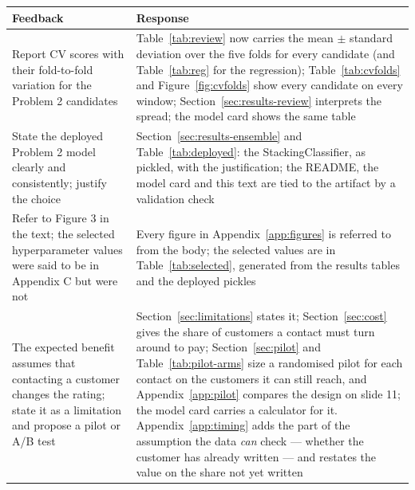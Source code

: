 \begin{center}
\begin{minipage}{\linewidth}
\centering
{}
\label{tab:feedback2}
\small
\begin{tabular}{@{}p{4.4cm}p{10.1cm}@{}}
\toprule
\textbf{Feedback} & \textbf{Response} \\
\midrule
Report CV scores with their fold-to-fold variation for the Problem 2
candidates &
Table~\ref{tab:review} now carries the mean $\pm$ standard deviation over the
five folds for every candidate (and Table~\ref{tab:reg} for the regression);
Table~\ref{tab:cvfolds} and Figure~\ref{fig:cvfolds} show every candidate on
every window; Section~\ref{sec:results-review} interprets the spread; the
model card shows the same table \\[2pt]
State the deployed Problem 2 model clearly and consistently; justify the
choice &
Section~\ref{sec:results-ensemble} and Table~\ref{tab:deployed}: the
StackingClassifier, as pickled, with the justification; the README, the model
card and this text are tied to the artifact by a validation check \\[2pt]
Refer to Figure 3 in the text; the selected hyperparameter values were said to
be in Appendix C but were not &
Every figure in Appendix~\ref{app:figures} is referred to from the body; the
selected values are in Table~\ref{tab:selected}, generated from the results
tables and the deployed pickles \\[2pt]
The expected benefit assumes that contacting a customer changes the rating;
state it as a limitation and propose a pilot or A/B test &
Section~\ref{sec:limitations} states it; Section~\ref{sec:cost} gives the share
of customers a contact must turn around to pay; Section~\ref{sec:pilot} and
Table~\ref{tab:pilot-arms} size a randomised pilot for each contact on the customers
it can still reach, and Appendix~\ref{app:pilot} compares the design on slide
11; the model card carries a calculator for it. Appendix~\ref{app:timing} adds
the part of the assumption the data \emph{can} check --- whether the customer
has already written --- and restates the value on the share not yet written \\
\bottomrule
\end{tabular}
\end{minipage}
\end{center}

